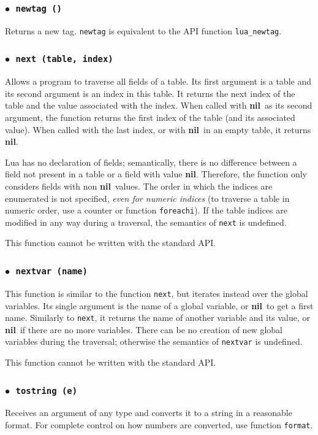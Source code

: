 \documentclass[11pt]{article}
\newcommand{\T}[1]{{\tt #1}}
\newcommand{\nil}{{\bf nil}}
\newcommand{\Deffunc}[1]{\index{#1}}
\newcommand{\ff}{$\bullet$\ }
\begin{document}
\subsubsection*{\ff \T{newtag ()}}\Deffunc{newtag}\label{pdf-newtag}
Returns a new tag.
\verb|newtag| is equivalent to the API function \verb|lua_newtag|.

\subsubsection*{\ff \T{next (table, index)}}\Deffunc{next}
Allows a program to traverse all fields of a table.
Its first argument is a table and its second argument
is an index in this table.
It returns the next index of the table and the
value associated with the index.
When called with \nil\ as its second argument,
the function returns the first index
of the table (and its associated value).
When called with the last index,
or with \nil\ in an empty table,
it returns \nil.

Lua has no declaration of fields;
semantically, there is no difference between a
field not present in a table or a field with value \nil.
Therefore, the function only considers fields with non \nil\ values.
The order in which the indices are enumerated is not specified,
\emph{even for numeric indices}
(to traverse a table in numeric order,
use a counter or function \verb|foreachi|).
If the table indices are modified in any way during a traversal,
the semantics of \verb|next| is undefined.

This function cannot be written with the standard API.

\subsubsection*{\ff \T{nextvar (name)}}\Deffunc{nextvar}
This function is similar to the function \verb|next|,
but iterates instead over the global variables.
Its single argument is the name of a global variable,
or \nil\ to get a first name.
Similarly to \verb|next|, it returns the name of another variable
and its value,
or \nil\ if there are no more variables.
There can be no creation of new global variables during the traversal;
otherwise the semantics of \verb|nextvar| is undefined.

This function cannot be written with the standard API.

\subsubsection*{\ff \T{tostring (e)}}\Deffunc{tostring}
Receives an argument of any type and
converts it to a string in a reasonable format.
For complete control on how numbers are converted,
use function \verb|format|.
\end{document}
